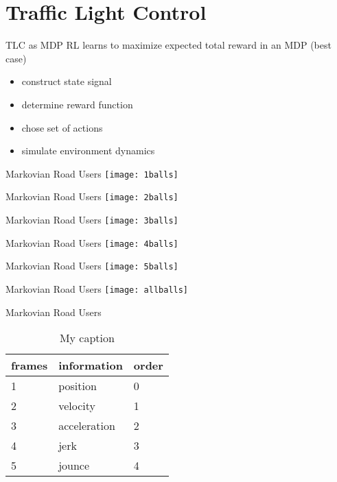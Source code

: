 \section{Traffic Light Control}

\begin{frame}{TLC as MDP}
RL learns to maximize expected total reward in an MDP (best case)

        \begin{itemize}
            \item \alert{construct state signal}
            \item determine reward function
            \item chose set of actions
            \item simulate environment dynamics
        \end{itemize}


\end{frame}

\begin{frame}{Markovian Road Users}
   \texttt{[image: 1balls]}
\end{frame}
\begin{frame}{Markovian Road Users}
   \texttt{[image: 2balls]}
\end{frame}
\begin{frame}{Markovian Road Users}
   \texttt{[image: 3balls]}
\end{frame}
\begin{frame}{Markovian Road Users}
   \texttt{[image: 4balls]}
\end{frame}
\begin{frame}{Markovian Road Users}
   \texttt{[image: 5balls]}
\end{frame}
\begin{frame}{Markovian Road Users}
   \texttt{[image: allballs]}
\end{frame}

\begin{frame}{Markovian Road Users}
\begin{table}[]
\centering
\caption{My caption}
\label{intersection state}
\begin{tabular}{@{}lll@{}}
\toprule
frames & information  & order \\ \midrule
1      & position     & 0     \\
2      & velocity     & 1     \\
3      & acceleration & 2     \\
4      & jerk         & 3     \\
5      & jounce       & 4     \\ \bottomrule
\end{tabular}
\end{table}
\end{frame}


